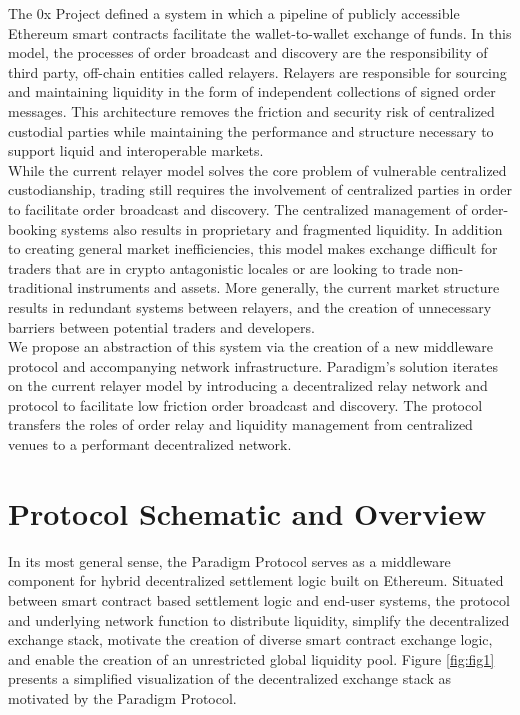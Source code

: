 \documentclass[9pt]{article}
\begin{document}
\noindent The 0x Project defined a system in which a pipeline of publicly accessible Ethereum smart contracts facilitate the wallet-to-wallet exchange of funds\cite{0xwhitepaper}. In this model, the processes of order broadcast and discovery are the responsibility of third party, off-chain entities called relayers. Relayers are responsible for sourcing and maintaining liquidity in the form of independent collections of signed order messages. This architecture removes the friction and security risk of centralized custodial parties while maintaining the performance and structure necessary to support liquid and interoperable markets. \\

\noindent While the current relayer model solves the core problem of vulnerable centralized custodianship, trading still requires the involvement of centralized parties in order to facilitate order broadcast and discovery. The centralized management of order-booking systems also results in proprietary and fragmented liquidity\cite{globalliquidity, eufinance}. In addition to creating general market inefficiencies, this model makes exchange difficult for traders that are in crypto antagonistic locales or are looking to trade non-traditional instruments and assets\cite{relayerideas}. More generally, the current market structure results in redundant systems between relayers, and the creation of unnecessary barriers between potential traders and developers. \\

\noindent We propose an abstraction of this system via the creation of a new middleware protocol and accompanying network infrastructure. Paradigm’s solution iterates on the current relayer model by introducing a decentralized relay network and protocol to facilitate low friction order broadcast and discovery. The protocol transfers the roles of order relay and liquidity management from centralized venues to a performant decentralized network. \\

\clearpage
\pagebreak

\section{Protocol Schematic and Overview}\label{schematic}

\noindent In its most general sense, the Paradigm Protocol serves as a middleware component for hybrid decentralized settlement logic built on Ethereum. Situated between smart contract based settlement logic and end-user systems, the protocol and underlying network function to distribute liquidity, simplify the decentralized exchange stack, motivate the creation of diverse smart contract exchange logic, and enable the creation of an unrestricted global liquidity pool. Figure \ref{fig:fig1} presents a simplified visualization of the decentralized exchange stack as motivated by the Paradigm Protocol. 
\end{document}
